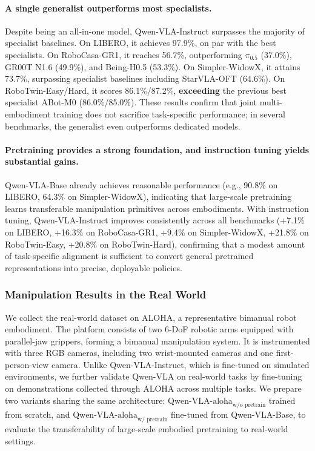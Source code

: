 \documentclass{article}
\begin{document}
\paragraph{A single generalist outperforms most specialists.} Despite being an all-in-one model, Qwen-VLA-Instruct surpasses the majority of specialist baselines. On LIBERO, it achieves 97.9\%, on
par with the best specialists. On RoboCasa-GR1, it reaches 56.7\%, outperforming $\pi_{0.5}$ (37.0\%), GR00T N1.6 (49.9\%), and Being-H0.5 (53.3\%). On Simpler-WidowX, it attains
73.7\%, surpassing specialist baselines including StarVLA-OFT (64.6\%). On RoboTwin-Easy/Hard, it scores 86.1\%/87.2\%, \textbf{exceeding} the previous best specialist ABot-M0
(86.0\%/85.0\%). These results confirm that joint multi-embodiment training does not sacrifice task-specific performance; in several benchmarks, the generalist even outperforms dedicated
models.

\paragraph{Pretraining provides a strong foundation, and instruction tuning yields substantial gains.} Qwen-VLA-Base already achieves reasonable performance (e.g., 90.8\% on LIBERO, 64.3\% on
Simpler-WidowX), indicating that large-scale pretraining learns transferable manipulation primitives across embodiments. With instruction tuning, Qwen-VLA-Instruct improves consistently across
all benchmarks (+7.1\% on LIBERO, +16.3\% on RoboCasa-GR1, +9.4\% on Simpler-WidowX, +21.8\% on RoboTwin-Easy, +20.8\% on RoboTwin-Hard), confirming that a modest amount of task-specific alignment
is sufficient to convert general pretrained representations into precise, deployable policies.



\subsubsection{Manipulation Results in the Real World}
We collect the real-world dataset on ALOHA, a representative bimanual robot embodiment. The platform consists of two 6-DoF robotic arms equipped with parallel-jaw grippers, forming a bimanual manipulation system. It is instrumented with three RGB cameras, including two wrist-mounted cameras and one first-person-view camera.
Unlike Qwen-VLA-Instruct, which is fine-tuned on simulated environments, we further validate Qwen-VLA on real-world tasks by fine-tuning on demonstrations collected through ALOHA across multiple tasks. We prepare two variants sharing the same architecture: ${\text{Qwen-VLA-aloha}}_{\text{w/o pretrain}}$ trained from scratch, and ${\text{Qwen-VLA-aloha}}_{\text{w/ pretrain}}$ fine-tuned from Qwen-VLA-Base, to evaluate the transferability of large-scale embodied pretraining to real-world settings.
\end{document}

